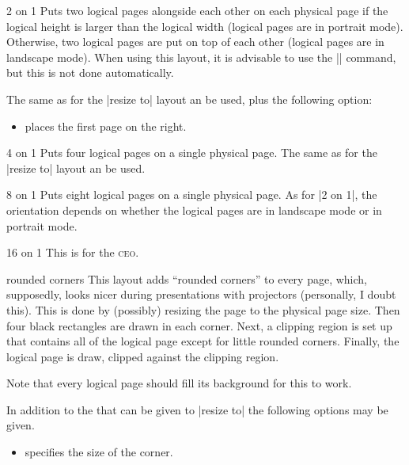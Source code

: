 \begin{pgflayout}{2 on 1}
  Puts two logical pages alongside each other on each physical page if
  the logical height is larger than the logical width (logical pages
  are in portrait mode). Otherwise, two
  logical pages are put on top of each other (logical pages are in
  landscape mode). When using this layout, it is advisable to use the
  |\nofiles| command, but this is not done automatically.

  The same  as for the |resize to| layout an be used,
  plus the following option:
  \begin{itemize}
  \item
    places the first page on the right.
  \end{itemize}
\end{pgflayout}


\begin{pgflayout}{4 on 1}
  Puts four logical pages on a single physical page.
  The same  as for the |resize to| layout an be used.
\end{pgflayout}

\begin{pgflayout}{8 on 1}
  Puts eight logical pages on a single physical page. As for |2 on 1|,
  the orientation depends on whether the logical pages are in
  landscape mode or in portrait mode.
\end{pgflayout}

\begin{pgflayout}{16 on 1}
  This is for the \textsc{ceo}.
\end{pgflayout}

\begin{pgflayout}{rounded corners}
  \label{layout-rounded-corners}
  This layout adds ``rounded corners'' to every page, which,
  supposedly, looks nicer during presentations with projectors
  (personally, I doubt this). This is done by (possibly) resizing the
  page to the physical page size. Then four black rectangles are
  drawn in each corner. Next, a clipping region is set up that
  contains all of the logical page except for little rounded
  corners. Finally, the logical page is draw, clipped against the
  clipping region. 

  Note that every logical page should fill its background for this to
  work.

  In addition to the  that can be given to |resize to|
  the following options may be given.
  \begin{itemize}
    \item {} specifies the size of
    the corner.
  \end{itemize}

\end{pgflayout}

